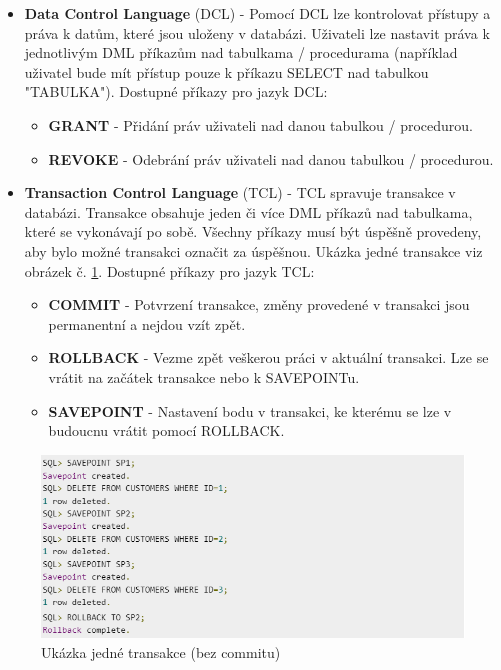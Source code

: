 \begin{itemize}
\item \textbf{Data Control Language} (DCL) - Pomocí DCL lze kontrolovat přístupy a práva k datům, které jsou uloženy v databázi. Uživateli lze nastavit práva k jednotlivým DML příkazům nad tabulkama / procedurama (například uživatel bude mít přístup pouze k příkazu SELECT nad tabulkou "TABULKA"). Dostupné příkazy pro jazyk DCL:
	\begin{itemize}
	\item \textbf{GRANT} - Přidání práv uživateli nad danou tabulkou / procedurou. 
	\item \textbf{REVOKE} - Odebrání práv uživateli nad danou tabulkou / procedurou.
	\end{itemize}

\item \textbf{Transaction Control Language} (TCL) - TCL spravuje transakce v databázi. Transakce obsahuje jeden či více DML příkazů nad tabulkama, které se vykonávají po sobě. Všechny příkazy musí být úspěšně provedeny, aby bylo možné transakci označit za úspěšnou. Ukázka jedné transakce viz obrázek č. \ref{fig:tcl_savepoint}. Dostupné příkazy pro jazyk TCL:
	\begin{itemize}
	\item \textbf{COMMIT} - Potvrzení transakce, změny provedené v transakci jsou permanentní a nejdou vzít zpět.
	\item \textbf{ROLLBACK} - Vezme zpět veškerou práci v aktuální transakci. Lze se vrátit na začátek transakce nebo k SAVEPOINTu.
	\item \textbf{SAVEPOINT} - Nastavení bodu v transakci, ke kterému se lze v budoucnu vrátit pomocí ROLLBACK.
	\end{itemize}
\end{itemize}
	\begin{figure}[H]
	\centering
	\includegraphics[width=14cm]{img/databaze/tcl_savepoint}
	\caption{Ukázka jedné transakce (bez commitu)}
	\label{fig:tcl_savepoint}
	\end{figure}

